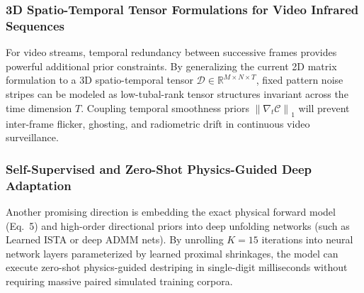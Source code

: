 \subsubsection{3D Spatio-Temporal Tensor Formulations for Video Infrared Sequences}
For video streams, temporal redundancy between successive frames provides powerful additional prior constraints. By generalizing the current 2D matrix formulation to a 3D spatio-temporal tensor $\boldsymbol{\mathcal{D}} \in \mathbb{R}^{M \times N \times T}$, fixed pattern noise stripes can be modeled as low-tubal-rank tensor structures invariant across the time dimension $T$. Coupling temporal smoothness priors $\left\|\nabla_t \boldsymbol{\mathcal{C}}\right\|_1$ will prevent inter-frame flicker, ghosting, and radiometric drift in continuous video surveillance.

\subsubsection{Self-Supervised and Zero-Shot Physics-Guided Deep Adaptation}
Another promising direction is embedding the exact physical forward model (Eq.~5) and high-order directional priors into deep unfolding networks (such as Learned ISTA or deep ADMM nets). By unrolling $K = 15$ iterations into neural network layers parameterized by learned proximal shrinkages, the model can execute zero-shot physics-guided destriping in single-digit milliseconds without requiring massive paired simulated training corpora.
